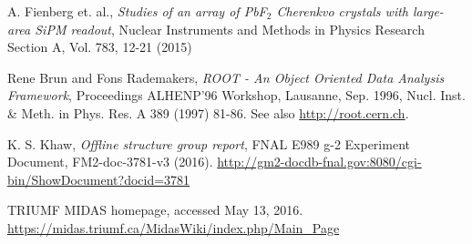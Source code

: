 \begin{thebibliography}{99}

A. Fienberg et. al.,
\emph{Studies of an array of PbF$_{2}$ Cherenkvo crystals with large-area SiPM readout},
Nuclear Instruments and Methods in Physics Research Section A, Vol. 783, 12-21 (2015)

Rene Brun and Fons Rademakers, 
\emph{ROOT - An Object Oriented Data Analysis Framework},
Proceedings ALHENP'96 Workshop, Lausanne, Sep. 1996, Nucl. Inst. \& Meth. in Phys. Res. A 389 (1997) 81-86. See also \url{http://root.cern.ch}.

K. S. Khaw,
\emph{Offline structure group report},
FNAL E989 g-2 Experiment Document, FM2-doc-3781-v3 (2016). \url{http://gm2-docdb-fnal.gov:8080/cgi-bin/ShowDocument?docid=3781}

TRIUMF MIDAS homepage, accessed May 13, 2016. 
\url{https://midas.triumf.ca/MidasWiki/index.php/Main_Page}

\end{thebibliography}
